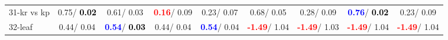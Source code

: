 \begin{table}[h]
\begin{center}
\begin{tabular}{lc|c|c|c|c|c|c|c}
31-kr vs kp &   0.75/\textcolor{black}{\textbf{  0.02}} &   0.61/  0.03 & \textcolor{red}{\textbf{  0.16}}/  0.09 &   0.23/  0.07 &   0.68/  0.05 &   0.28/  0.09 & \textcolor{blue}{\textbf{  0.76}}/\textcolor{black}{\textbf{  0.02}} &   0.23/  0.09 \\
32-leaf &   0.44/  0.04 & \textcolor{blue}{\textbf{  0.54}}/\textcolor{black}{\textbf{  0.03}} &   0.44/  0.04 & \textcolor{blue}{\textbf{  0.54}}/  0.04 & \textcolor{red}{\textbf{ -1.49}}/  1.04 & \textcolor{red}{\textbf{ -1.49}}/  1.03 & \textcolor{red}{\textbf{ -1.49}}/  1.04 & \textcolor{red}{\textbf{ -1.49}}/  1.04 \\\end{tabular}\label{stratsALCKappa0bNB}
\end{center}
\end{table}
